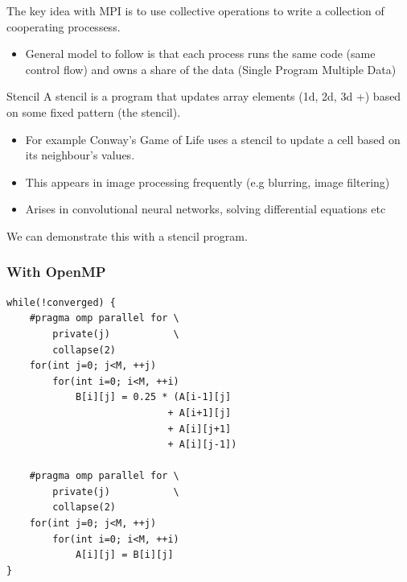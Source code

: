 The key idea with MPI is to use collective operations to write a collection of cooperating processess.
\begin{itemize}
	\item General model to follow is that each process runs the same code (same control flow) and owns a share of the data (Single Program Multiple Data)
\end{itemize}
\begin{sidenotebox}{Stencil}
	A stencil is a program that updates array elements (1d, 2d, 3d +) based on some fixed pattern (the stencil).
	\begin{itemize}
		\item For example Conway's Game of Life uses a stencil to update a cell based on its neighbour's values.
		\item This appears in image processing frequently (e.g blurring, image filtering)
		\item Arises in convolutional neural networks, solving differential equations etc
	\end{itemize}
\end{sidenotebox}
We can demonstrate this with a stencil program.
\subsubsection{With OpenMP}
\begin{verbatim}
while(!converged) {
    #pragma omp parallel for \
        private(j)           \
        collapse(2)
    for(int j=0; j<M, ++j)
        for(int i=0; i<M, ++i)
            B[i][j] = 0.25 * (A[i-1][j] 
                            + A[i+1][j] 
                            + A[i][j+1] 
                            + A[i][j-1])
    
    #pragma omp parallel for \
        private(j)           \
        collapse(2)
    for(int j=0; j<M, ++j)
        for(int i=0; i<M, ++i)
            A[i][j] = B[i][j]
}
\end{verbatim}


